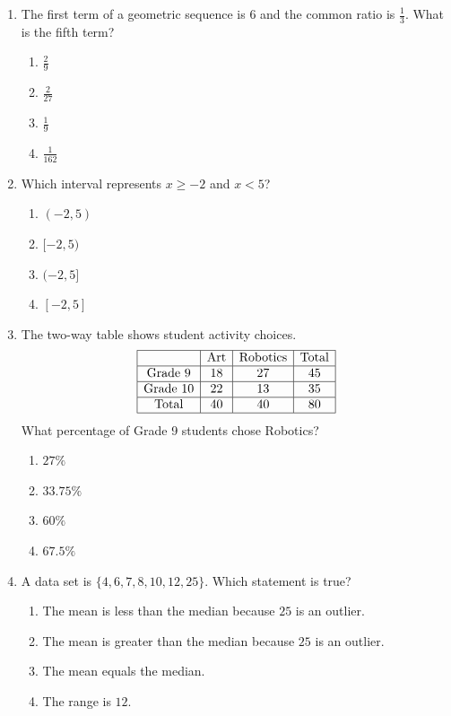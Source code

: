 \documentclass[11pt]{article}
\begin{document}
\begin{enumerate}
\item The first term of a geometric sequence is $6$ and the common ratio is $\frac{1}{3}$. What is the fifth term?
\begin{enumerate}[label=(\Alph*)]
\item $\frac{2}{9}$ \item $\frac{2}{27}$ \item $\frac{1}{9}$ \item $\frac{1}{162}$
\end{enumerate}

\item Which interval represents $x\geq -2$ and $x<5$?
\begin{enumerate}[label=(\Alph*)]
\item $(-2,5)$ \item $[-2,5)$ \item $(-2,5]$ \item $[-2,5]$
\end{enumerate}

\item The two-way table shows student activity choices.
\[
\begin{array}{|c|c|c|c|}
\hline
&\text{Art}&\text{Robotics}&\text{Total}\\ \hline
\text{Grade 9}&18&27&45\\ \hline
\text{Grade 10}&22&13&35\\ \hline
\text{Total}&40&40&80\\ \hline
\end{array}
\]
What percentage of Grade 9 students chose Robotics?
\begin{enumerate}[label=(\Alph*)]
\item $27\%$ \item $33.75\%$ \item $60\%$ \item $67.5\%$
\end{enumerate}

\newpage
\item A data set is $\{4,6,7,8,10,12,25\}$. Which statement is true?
\begin{enumerate}[label=(\Alph*)]
\item The mean is less than the median because $25$ is an outlier.
\item The mean is greater than the median because $25$ is an outlier.
\item The mean equals the median.
\item The range is $12$.
\end{enumerate}


\end{enumerate}
\end{document}
